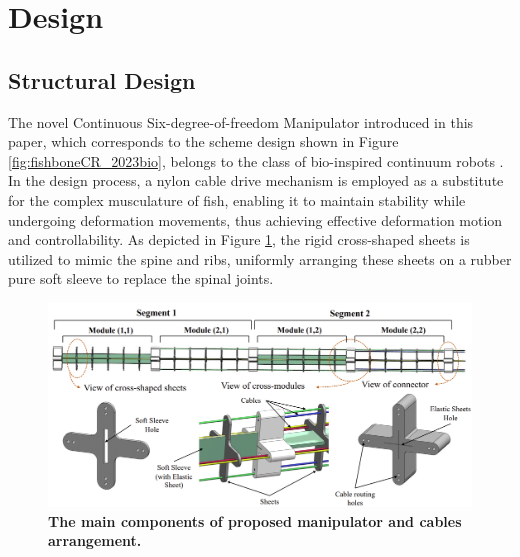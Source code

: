 \section{Design} 
\subsection{Structural Design}
The novel Continuous Six-degree-of-freedom Manipulator introduced in this paper, which corresponds to the scheme design 
shown in Figure \ref{fig:fishboneCR_2023bio}, belongs to the class of bio-inspired continuum robots \cite{fishboneCR}. 
In the design process, a nylon cable drive mechanism is employed as a substitute for the complex musculature of fish, 
enabling it to maintain stability while undergoing deformation movements, thus achieving effective deformation motion 
and controllability. As depicted in Figure \ref{fig:main_components}, the rigid cross-shaped sheets is utilized to mimic 
the spine and ribs, uniformly arranging these sheets on a rubber pure soft sleeve to replace the spinal joints.
\begin{figure}[H] %
    \centering
    \captionsetup{labelsep=colon}
    \includegraphics[width=1.0\textwidth]{Image/Design/main_component_of_manipulator.png} 
    \caption[The main components of proposed manipulator and cables arrangement]
    {\centering \textbf{The main components of proposed manipulator and cables arrangement.}}
    \label{fig:main_components}
\end{figure}
